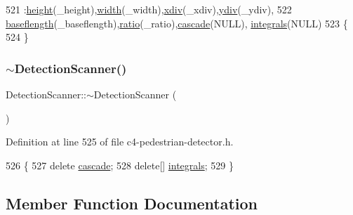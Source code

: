 \begin{DoxyCode}
521         :\mbox{\hyperlink{class_detection_scanner_a0526f032d5e7efd9fced2592ad5c8d03}{height}}(\_height),\mbox{\hyperlink{class_detection_scanner_a37d12c13060640ad0321f089cd565476}{width}}(\_width),\mbox{\hyperlink{class_detection_scanner_ab7083b6ed15a71fa96d623a8f6500613}{xdiv}}(\_xdiv),\mbox{\hyperlink{class_detection_scanner_a78f38bf8d0990ad9ea8cea03ffe4a189}{ydiv}}(\_ydiv),
522          \mbox{\hyperlink{class_detection_scanner_aee5791fae7267a2f4a56e429d8842e6e}{baseflength}}(\_baseflength),\mbox{\hyperlink{class_detection_scanner_a2ac93d1b6aca1959d57133c08b0eaa1c}{ratio}}(\_ratio),\mbox{\hyperlink{class_detection_scanner_a5fd4ac1b6a6c56a95543eca549c26634}{cascade}}(NULL),
      \mbox{\hyperlink{class_detection_scanner_a0f64092660cd084b8a1d3b6e8e30cabb}{integrals}}(NULL)
523     \{
524     \}
\end{DoxyCode}
\mbox{\label{class_detection_scanner_a45748bbcdf66b62a0122729076a67e17}} 
\subsubsection{\texorpdfstring{$\sim$\+Detection\+Scanner()}{~DetectionScanner()}}
{\footnotesize\ttfamily Detection\+Scanner\+::$\sim$\+Detection\+Scanner (\begin{DoxyParamCaption}{ }\end{DoxyParamCaption})\hspace{0.3cm}{\ttfamily [inline]}}



Definition at line 525 of file c4-\/pedestrian-\/detector.\+h.


\begin{DoxyCode}
526     \{
527         \textcolor{keyword}{delete} \mbox{\hyperlink{class_detection_scanner_a5fd4ac1b6a6c56a95543eca549c26634}{cascade}};
528         \textcolor{keyword}{delete}[] \mbox{\hyperlink{class_detection_scanner_a0f64092660cd084b8a1d3b6e8e30cabb}{integrals}};
529     \}
\end{DoxyCode}


\subsection{Member Function Documentation}
\mbox{\label{class_detection_scanner_aa27d494b253975922d853070aab7ce4d}} 
